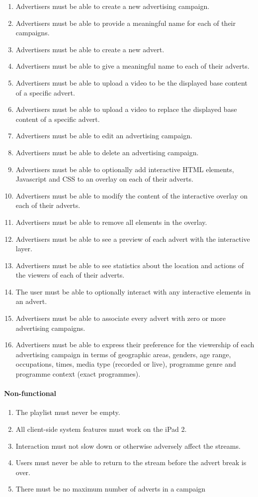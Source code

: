 \begin{enumerate}
			\item{Advertisers must be able to create a new advertising campaign.}
			\item{Advertisers must be able to provide a meaningful name for each of their campaigns.}
			\item{Advertisers must be able to create a new advert.}
			\item{Advertisers must be able to give a meaningful name to each of their adverts.}
			\item{Advertisers must be able to upload a video to be the displayed base content of a specific advert.}
			\item{Advertisers must be able to upload a video to replace the displayed base content of a specific advert.}
			\item{Advertisers must be able to edit an advertising campaign.}
			\item{Advertisers must be able to delete an advertising campaign.}
			\item{Advertisers must be able to optionally add interactive HTML elements, Javascript and CSS to an overlay on each of their adverts.}
			\item{Advertisers must be able to modify the content of the interactive overlay on each of their adverts.}
			\item{Advertisers must be able to remove all elements in the overlay.}
			\item{Advertisers must be able to see a preview of each advert with the interactive layer.}
			\item{Advertisers must be able to see statistics about the location and actions of the viewers of each of their adverts.}
			\item{The user must be able to optionally interact with any interactive elements in an advert.}
			\item{Advertisers must be able to associate every advert with zero or more advertising campaigns.}
			\item{Advertisers must be able to express their preference for the viewership of each advertising campaign in terms of geographic areas, genders, age range, occupations, times, media type (recorded or live), programme genre and programme context (exact programmes).}
		\end{enumerate}
	\paragraph{Non-functional}
		\begin{enumerate}
			\item{The playlist must never be empty.}
			\item{All client-side system features must work on the iPad 2.}
			\item{Interaction must not slow down or otherwise adversely affect the streams.}
			\item{Users must never be able to return to the stream before the advert break is over.}
			\item{There must be no maximum number of adverts in a campaign}
		\end{enumerate}
